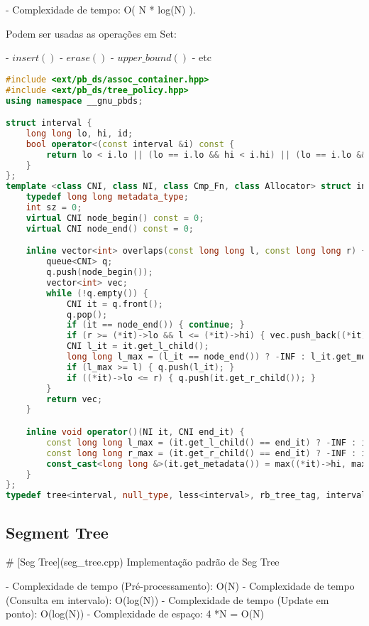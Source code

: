 \documentclass[11pt, a4paper, twoside]{article}
\begin{document}
- Complexidade de tempo: O( N * log(N) ).

Podem ser usadas as operações em Set: 

- $insert()$
- $erase()$ 
- $upper\_bound()$
- etc 

\begin{lstlisting}[language=C++]
#include <ext/pb_ds/assoc_container.hpp>
#include <ext/pb_ds/tree_policy.hpp>
using namespace __gnu_pbds;

struct interval {
    long long lo, hi, id;
    bool operator<(const interval &i) const {
        return lo < i.lo || (lo == i.lo && hi < i.hi) || (lo == i.lo && hi == i.hi && id < i.id);
    }
};
template <class CNI, class NI, class Cmp_Fn, class Allocator> struct intervals_node_update {
    typedef long long metadata_type;
    int sz = 0;
    virtual CNI node_begin() const = 0;
    virtual CNI node_end() const = 0;

    inline vector<int> overlaps(const long long l, const long long r) {
        queue<CNI> q;
        q.push(node_begin());
        vector<int> vec;
        while (!q.empty()) {
            CNI it = q.front();
            q.pop();
            if (it == node_end()) { continue; }
            if (r >= (*it)->lo && l <= (*it)->hi) { vec.push_back((*it)->id); }
            CNI l_it = it.get_l_child();
            long long l_max = (l_it == node_end()) ? -INF : l_it.get_metadata();
            if (l_max >= l) { q.push(l_it); }
            if ((*it)->lo <= r) { q.push(it.get_r_child()); }
        }
        return vec;
    }

    inline void operator()(NI it, CNI end_it) {
        const long long l_max = (it.get_l_child() == end_it) ? -INF : it.get_l_child().get_metadata();
        const long long r_max = (it.get_r_child() == end_it) ? -INF : it.get_r_child().get_metadata();
        const_cast<long long &>(it.get_metadata()) = max((*it)->hi, max(l_max, r_max));
    }
};
typedef tree<interval, null_type, less<interval>, rb_tree_tag, intervals_node_update> interval_tree;
\end{lstlisting}

\subsection{Segment Tree}



\# [Seg Tree](seg\_tree.cpp)
Implementação padrão de Seg Tree

- Complexidade de tempo (Pré-processamento): O(N)
- Complexidade de tempo (Consulta em intervalo): O(log(N))
- Complexidade de tempo (Update em ponto): O(log(N))
- Complexidade de espaço: 4 *N = O(N)
\end{document}
